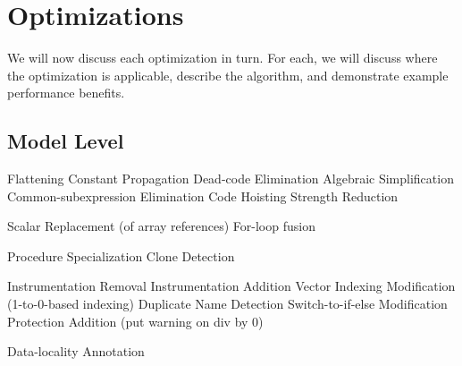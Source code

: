 \section{Optimizations}

We will now discuss each optimization in turn. For each, we will discuss where the optimization is applicable, describe the algorithm, and demonstrate example performance benefits.

\subsection{Model Level}



Flattening
Constant Propagation
Dead-code Elimination
Algebraic Simplification
Common-subexpression Elimination
Code Hoisting
Strength Reduction

Scalar Replacement (of array references)
For-loop fusion

Procedure Specialization
Clone Detection

Instrumentation Removal
Instrumentation Addition
Vector Indexing Modification (1-to-0-based indexing)
Duplicate Name Detection
Switch-to-if-else Modification
Protection Addition (put warning on div by 0)

Data-locality Annotation

